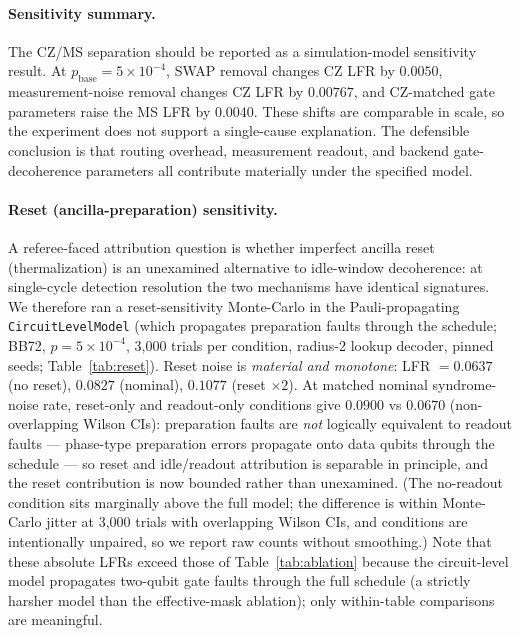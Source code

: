 \documentclass[11pt,a4paper]{article}
\begin{document}
\paragraph{Sensitivity summary.}
The CZ/MS separation should be reported as a simulation-model sensitivity result.
At $p_{\mathrm{base}}=5\times10^{-4}$, SWAP removal changes CZ LFR by $0.0050$, measurement-noise removal changes CZ LFR by $0.00767$, and CZ-matched gate parameters raise the MS LFR by $0.0040$.
These shifts are comparable in scale, so the experiment does not support a single-cause explanation.
The defensible conclusion is that routing overhead, measurement readout, and backend gate-decoherence parameters all contribute materially under the specified model.

\paragraph{Reset (ancilla-preparation) sensitivity.}
A referee-faced attribution question is whether imperfect ancilla reset
(thermalization) is an unexamined alternative to idle-window
decoherence: at single-cycle detection resolution the two mechanisms
have identical signatures. We therefore ran a reset-sensitivity
Monte-Carlo in the Pauli-propagating \texttt{CircuitLevelModel} (which
propagates preparation faults through the schedule; BB72,
$p=5\times10^{-4}$, 3{,}000 trials per condition, radius-2 lookup
decoder, pinned seeds; Table~\ref{tab:reset}).
Reset noise is \emph{material and monotone}: LFR $=0.0637$ (no reset),
$0.0827$ (nominal), $0.1077$ (reset $\times2$). At matched nominal
syndrome-noise rate, reset-only and readout-only conditions give
$0.0900$ vs $0.0670$ (non-overlapping Wilson CIs): preparation faults
are \emph{not} logically equivalent to readout faults --- phase-type
preparation errors propagate onto data qubits through the schedule ---
so reset and idle/readout attribution is separable in principle, and
the reset contribution is now bounded rather than unexamined.
(The no-readout condition sits marginally above the full model; the
difference is within Monte-Carlo jitter at 3{,}000 trials with
overlapping Wilson CIs, and conditions are intentionally unpaired, so
we report raw counts without smoothing.)
Note that these absolute LFRs exceed those of
Table~\ref{tab:ablation} because the circuit-level model propagates
two-qubit gate faults through the full schedule (a strictly harsher
model than the effective-mask ablation); only within-table comparisons
are meaningful.
\end{document}
